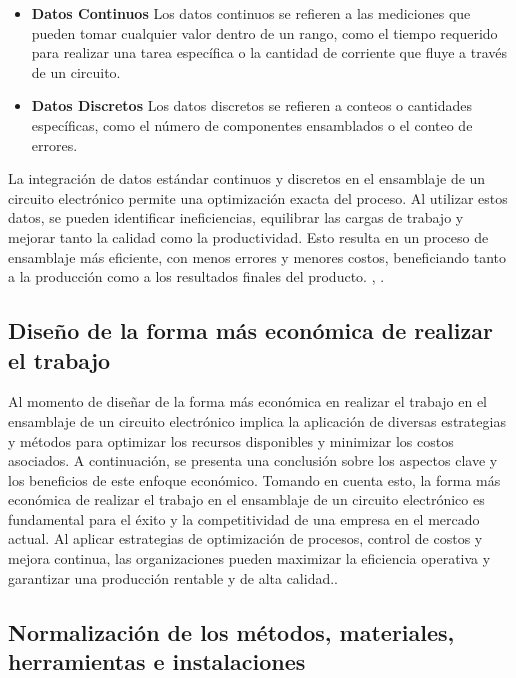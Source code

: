     \begin{itemize}
        \item \textbf{Datos Continuos}
    Los datos continuos se refieren a las mediciones que pueden tomar cualquier valor dentro de un rango, como el tiempo requerido para realizar una tarea específica o la cantidad de corriente que fluye a través de un circuito.
    \item \textbf{Datos Discretos}
    Los datos discretos se refieren a conteos o cantidades específicas, como el número de componentes ensamblados o el conteo de errores.
    
    \end{itemize}
    La integración de datos estándar continuos y discretos en el ensamblaje de un circuito electrónico permite una optimización exacta del proceso. Al utilizar estos datos, se pueden identificar ineficiencias, equilibrar las cargas de trabajo y mejorar tanto la calidad como la productividad. Esto resulta en un proceso de ensamblaje más eficiente, con menos errores y menores costos, beneficiando tanto a la producción como a los resultados finales del producto.
    \cite{Groover}, \cite{Niebel2}.
    \subsection{Diseño de la forma más económica de realizar el trabajo}
    Al momento de diseñar de la forma más económica en realizar el trabajo en el ensamblaje de un circuito electrónico implica la aplicación de diversas estrategias y métodos para optimizar los recursos disponibles y minimizar los costos asociados. A continuación, se presenta una conclusión sobre los aspectos clave y los beneficios de este enfoque económico.
    Tomando en cuenta esto, la forma más económica de realizar el trabajo en el ensamblaje de un circuito electrónico es fundamental para el éxito y la competitividad de una empresa en el mercado actual. Al aplicar estrategias de optimización de procesos, control de costos y mejora continua, las organizaciones pueden maximizar la eficiencia operativa y garantizar una producción rentable y de alta calidad.\cite{Mashuca}.
    \subsection{Normalización de los métodos, materiales, herramientas e instalaciones}
    
